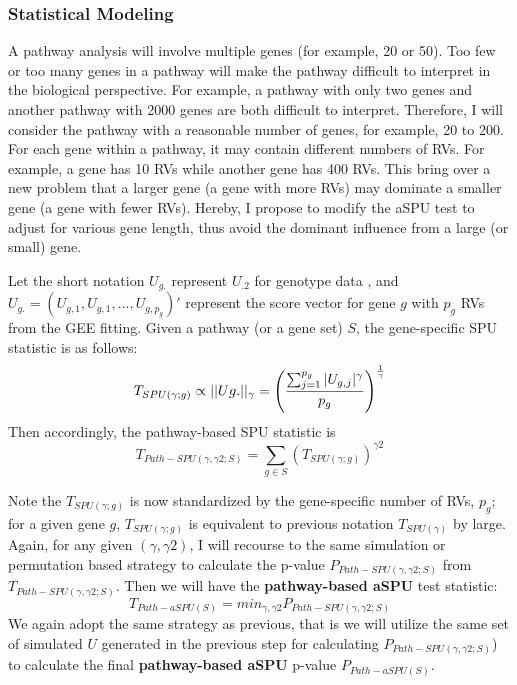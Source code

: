 \documentclass[12pt]{article}
\begin{document}
\subsubsection{Statistical Modeling}\label{sec:aim2-1}
A pathway analysis will involve multiple genes (for example, 20 or 50). Too few or too many genes in a pathway will make the pathway difficult to interpret in the biological perspective. For example, a pathway with only two genes and another pathway with 2000 genes are both difficult to interpret. Therefore, I will consider the pathway with a reasonable number of genes, for example, 20 to 200. For each gene within a pathway, it may contain different numbers of RVs. For example, a gene has 10 RVs while another gene has 400 RVs. This bring over a new problem that a larger gene (a gene with more RVs) may dominate a smaller gene (a gene with fewer RVs). Hereby, I propose to modify the aSPU test to adjust for various gene length, thus avoid the dominant influence from a large (or small) gene.

Let the short notation $U_{g.}$ represent $U_{.2}$ for genotype data %
, and $U_{g.} = (U_{g,1},U_{g,1},\ldots, U_{g,p_g})'$ represent the score vector for gene $g$ with $p_g$ RVs from the GEE fitting. Given a pathway (or a gene set) $S$, the gene-specific SPU statistic is as follows:
\begin{equation}
T_ { SPU(\gamma ; g) } \propto || Ug.||_{\gamma} =  \left( \frac{  \sum_{j=1} ^ {p_g} |U_{g, j}| ^ { \gamma }  }{p_g} \right) ^ { 1 \over \gamma }
\end{equation}  
Then accordingly, the pathway-based SPU statistic is
\begin{equation}
T _ { Path-SPU(\gamma, \gamma2 ; S) } = \sum_{g \in S} ( T_ { SPU(\gamma ; g) } ) ^ {\gamma2}
\end{equation}  

Note the $T_ { SPU(\gamma ; g) }$ is now standardized by the gene-specific number of RVs, $p_g$; for a given gene $g$, $T_ { SPU(\gamma ; g) }$ is equivalent to previous notation $T_ { SPU(\gamma ) }$ by large. Again, for any given $(\gamma, \gamma2)$, I will recourse to the same simulation or permutation based strategy to calculate the p-value $P _ { Path-SPU(\gamma, \gamma2 ; S) }$ from $T _ { Path-SPU(\gamma, \gamma2 ; S) }$. Then we will have the \textbf{pathway-based aSPU} test statistic:
\begin{equation}
T _ { Path-aSPU(S) } = min_{\gamma, \gamma2} P _ { Path-SPU(\gamma, \gamma2 ; S) }
\end{equation}
We again adopt the same strategy as previous, that is we will utilize the same set of simulated $U$ generated in the previous step for calculating $P _ { Path-SPU(\gamma, \gamma2 ; S) }$) to calculate the final \textbf{pathway-based aSPU} p-value $P _ { Path-aSPU(S) }$.
\end{document}
